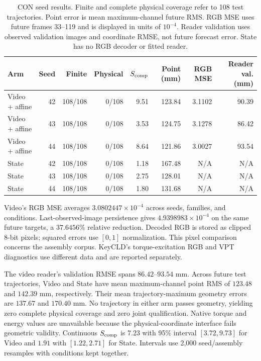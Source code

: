 \begin{table}[t]
\caption{CON seed results. Finite and complete physical coverage refer to 108 test trajectories. Point error is mean maximum-channel future RMS. RGB MSE uses future frames 33--119 and is displayed in units of $10^{-4}$. Reader validation uses observed validation images and coordinate RMSE, not future forecast error. State has no RGB decoder or fitted reader.}
\label{app:con-seeds}
\centering\small
\begin{tabular}{lrrrrrrr}
\toprule
Arm & Seed & Finite & Physical & $S_{\rm comp}$ & Point (mm) & RGB MSE & Reader val. (mm)\\
\midrule
Video + affine & 42 & 108/108 & 0/108 & 9.51 & 123.84 & 3.1102 & 90.39 \\
Video + affine & 43 & 108/108 & 0/108 & 3.53 & 124.75 & 3.1278 & 86.42 \\
Video + affine & 44 & 108/108 & 0/108 & 8.64 & 121.86 & 3.0027 & 93.54 \\
State & 42 & 108/108 & 0/108 & 1.18 & 167.48 & N/A & N/A \\
State & 43 & 108/108 & 0/108 & 2.75 & 128.01 & N/A & N/A \\
State & 44 & 108/108 & 0/108 & 1.80 & 131.68 & N/A & N/A \\
\bottomrule
\end{tabular}
\end{table}

Video's RGB MSE averages $3.0802447\times10^{-4}$ across seeds, families, and conditions. Last-observed-image persistence gives $4.9398983\times10^{-4}$ on the same future targets, a $37.6456\%$ relative reduction. Decoded RGB is stored as clipped 8-bit pixels; squared errors use $[0,1]$ normalization. This pixel comparison concerns the assembly corpus. KeyCLD's torque-excitation RGB and VPT diagnostics use different data and are reported separately.

The video reader's validation RMSE spans $86.42$--$93.54$ mm. Across future test trajectories, Video and State have mean maximum-channel point RMS of $123.48$ and $142.39$ mm, respectively. Their mean trajectory-maximum geometry errors are $137.67$ and $170.40$ mm. No trajectory in either arm passes geometry, yielding zero complete physical coverage and zero joint qualification. Native torque and energy values are unavailable because the physical-coordinate interface fails geometric validity. Continuous $S_{\rm comp}$ is $7.23$ with 95\% interval $[3.72,9.73]$ for Video and $1.91$ with $[1.22,2.71]$ for State. Intervals use 2,000 seed/assembly resamples with conditions kept together.

